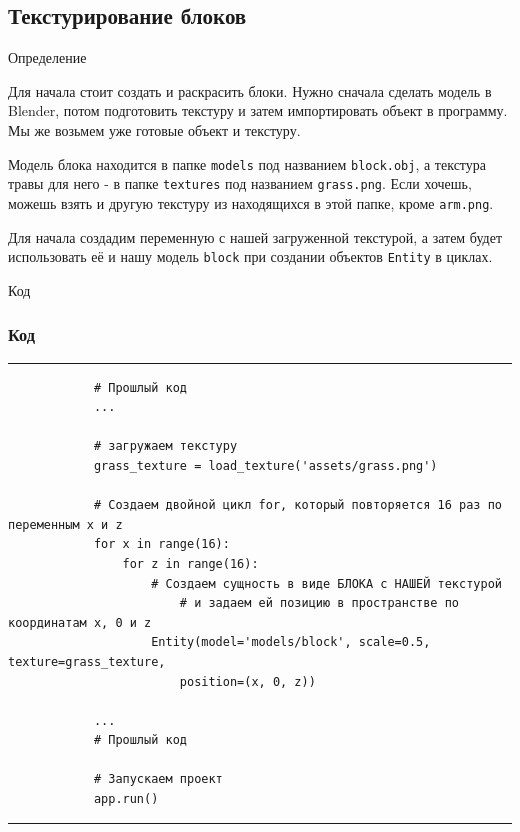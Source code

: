 \documentclass[handout]{beamer}
\begin{document}
    \subsection{Текстурирование блоков}
    \begin{frame}{Определение}
        \begin{justify}
            Для начала стоит создать и раскрасить блоки. Нужно сначала сделать модель в Blender, потом подготовить текстуру и затем импортировать объект в программу. 
            Мы же возьмем уже готовые объект и текстуру.
            
            Модель блока находится в папке \texttt{models} под названием \texttt{block.obj}, а текстура травы для него - в папке \texttt{textures} под названием \texttt{grass.png}. Если хочешь, можешь взять и другую текстуру из находящихся в этой папке, кроме \texttt{arm.png}.
            
            Для начала создадим переменную с нашей загруженной текстурой, а затем будет использовать её и нашу модель \texttt{block} при создании объектов \texttt{Entity} в циклах.
        \end{justify}
    \end{frame}

    \begin{frame}[fragile]{Код}
        \frametitle{Код}
        \scriptsize
        \rule{\textwidth}{1pt}
        \begin{verbatim}
            # Прошлый код
            ...
            
            # загружаем текстуру
            grass_texture = load_texture('assets/grass.png')
            
            # Создаем двойной цикл for, который повторяется 16 раз по переменным x и z
            for x in range(16): 
            	for z in range(16):
            	    # Создаем сущность в виде БЛОКА с НАШЕЙ текстурой 
                        # и задаем ей позицию в пространстве по координатам x, 0 и z
            	    Entity(model='models/block', scale=0.5, texture=grass_texture, 
                        position=(x, 0, z))
            
            ...
            # Прошлый код
            
            # Запускаем проект
            app.run()
        \end{verbatim}
        \rule{\textwidth}{1pt}
    \end{frame}
    
\end{document}
